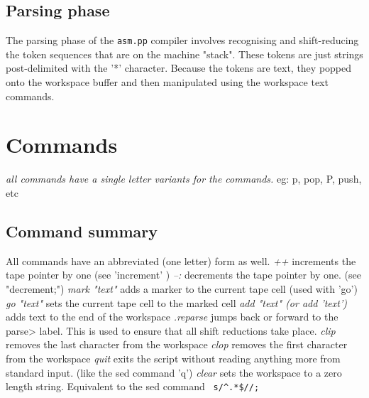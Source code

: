 \documentclass[a4paper,12pt]{article}
\begin{document}
\subsection{Parsing phase}
  
  The parsing phase of the \texttt{asm.pp} compiler involves recognising and
  shift-reducing the token sequences that are on the machine "stack".
  These tokens are just strings post-delimited with the '*' character.
  Because the tokens are text, they popped onto the workspace buffer
  and then manipulated using the workspace text commands.
 
\section{Commands}
 \emph{ all commands have a single letter variants for the commands.  }
    eg: p, pop, P, push, etc

\subsection{Command summary}
 
   All commands have an abbreviated (one letter) form as well.
 \emph{ ++  }
      increments the tape pointer by one (see 'increment' )
 \emph{ --: }
      decrements the tape pointer by one. (see "decrement;")
 \emph{ mark "text" }
      adds a marker to the current tape cell (used with 'go')
 \emph{ go "text" }
      sets the current tape cell to the marked cell
 \emph{ add "text" (or add 'text') }
      adds text to the end of the workspace
 \emph{ .reparse  }
      jumps back or forward to the parse> label. This is used to ensure that
      all shift reductions take place.
 \emph{ clip }
      removes the last character from the workspace
 \emph{ clop }
      removes the first character from the workspace
 \emph{ quit  }
      exits the script without reading anything more from
      standard input. (like the sed command 'q')
 \emph{ clear }
      sets the workspace to a zero length string. Equivalent
      to the sed command 
 \verb| s/^.*$//; |
\end{document}
